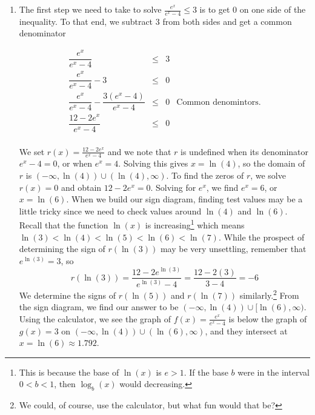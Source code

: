\begin{ex}
\begin{enumerate}
\begin{center}
\begin{tabular}{m{2in}c}
\end{tabular}

\end{center}

\item The first step we need to take to solve  $\frac{e^{x}}{e^{x}-4} \leq 3$ is to get $0$ on one side of the inequality. To that end, we subtract $3$ from both sides and get a common denominator


\setlength{\extrarowheight}{12pt}
\[ \begin{array}{rclr}

\dfrac{e^{x}}{e^{x}-4} & \leq & 3 & \\

\dfrac{e^{x}}{e^{x}-4} - 3 & \leq & 0 & \\

\dfrac{e^{x}}{e^{x}-4} - \dfrac{3 \left(e^{x}-4\right)}{e^{x}-4} & \leq & 0 & \mbox{Common denomintors.} \\

\dfrac{12 - 2e^{x}}{e^{x}-4} & \leq & 0 & \\

\end{array}\]
\setlength{\extrarowheight}{2pt}

We set $r(x) = \frac{12 - 2e^{x}}{e^{x}-4}$ and we note that $r$ is undefined when its denominator $e^{x}-4=0$, or when $e^{x} = 4$.  Solving this gives $x = \ln(4)$, so the domain of $r$ is $(-\infty, \ln(4)) \cup (\ln(4), \infty)$. To find the zeros of $r$, we solve $r(x) = 0$ and obtain $12 - 2e^{x} = 0$.  Solving for $e^{x}$, we find $e^{x} = 6$, or $x = \ln(6)$.  When we build our sign diagram, finding test values may be a little tricky since we need to check values around $\ln(4)$ and $\ln(6)$.  Recall that the function $\ln(x)$ is increasing\footnote{This is because the base of $\ln(x)$ is $e > 1$.  If the base $b$ were in the interval $0 < b < 1$, then $\log_{b}(x)$ would decreasing.} which means $\ln(3) < \ln(4) < \ln(5) < \ln(6) < \ln(7)$.  While the prospect of determining the sign of $r\left(\ln(3)\right)$ may be very unsettling, remember that $e^{\ln(3)} = 3$, so \[r\left(\ln(3)\right) = \frac{12 - 2e^{\ln(3)}}{e^{\ln(3)}-4} = \frac{12-2(3)}{3-4} = -6\]  We determine the signs of $r\left(\ln(5)\right)$ and $r\left(\ln(7)\right)$ similarly.\footnote{We could, of course, use the calculator, but what fun would that be?} From the sign diagram, we find our answer to be $(-\infty,\ln(4)) \cup [\ln(6), \infty)$.  Using the calculator, we see the graph of $f(x) = \frac{e^{x}}{e^{x}-4}$ is below the graph of $g(x) = 3$ on $(-\infty,\ln(4)) \cup (\ln(6), \infty)$, and they intersect at $x = \ln(6) \approx 1.792$.



\end{enumerate}
\end{ex}
